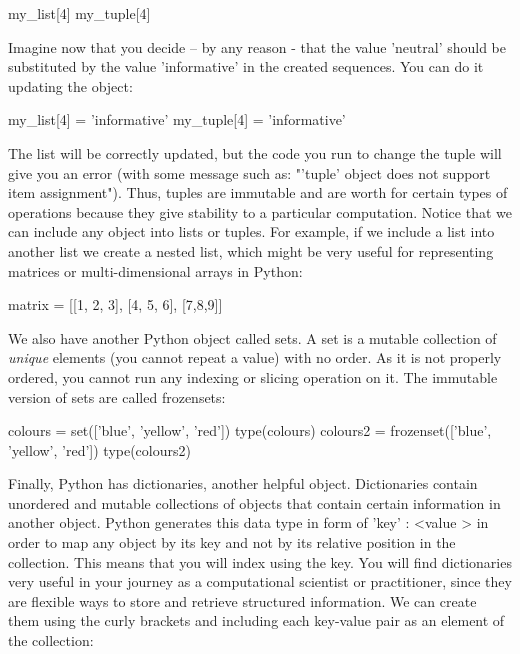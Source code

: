 \begin{examplepy}
my_list[4]
my_tuple[4]
\end{examplepy}

Imagine now that you decide – by any reason - that the value 'neutral' should be substituted by the value 'informative' in the created sequences. You can do it updating the object:

\begin{examplepy}
my_list[4] = 'informative'
my_tuple[4] = 'informative'
\end{examplepy}

The list will be correctly updated, but the code you run to change the tuple will give you an error (with some message such as: "'tuple' object does not support item assignment"). Thus, tuples are immutable and are worth for certain types of operations because they give stability to a particular computation. Notice that we can include any object into lists or tuples. For example, if we include a list into another list we create a nested list, which might be very useful for representing matrices or multi-dimensional arrays in Python:

\begin{examplepy}
matrix = [[1, 2, 3], [4, 5, 6], [7,8,9]] 
\end{examplepy}	

We also have another Python object called sets. A set is a mutable collection of \emph{unique} elements (you cannot repeat a value) with no order. As it is not properly ordered, you cannot run any indexing or slicing operation on it. The immutable version of sets are called frozensets:

\begin{examplepy}
colours = set(['blue', 'yellow', 'red'])
type(colours)
colours2 = frozenset(['blue', 'yellow', 'red'])
type(colours2)
\end{examplepy}

Finally, Python has dictionaries, another helpful object.	 Dictionaries contain unordered and mutable collections of objects that contain certain information in another object. Python generates this data type in form of { 'key' : \textless value \textgreater} in order to map any object by its key and not by its relative position in the collection. This means that you will index using the key. You will find dictionaries very useful in your journey as a computational scientist or practitioner, since they are flexible ways to store and retrieve structured information. We can create them using the curly brackets {} and including each key-value pair as an element of the collection:

